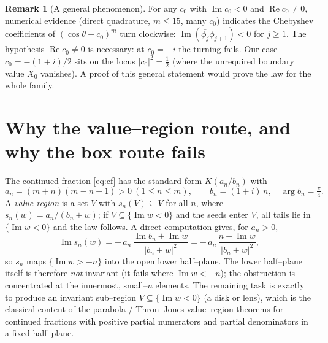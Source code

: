 \documentclass[11pt]{article}
\theoremstyle{definition}
\newtheorem{remark}{Remark}
\renewcommand{\Re}{\operatorname{Re}}
\renewcommand{\Im}{\operatorname{Im}}
\begin{document}
\begin{remark}[A general phenomenon]
For any $c_0$ with $\Im c_0<0$ and $\Re c_0\ne0$, numerical evidence (direct quadrature,
$m\le 15$, many $c_0$) indicates the Chebyshev coefficients of $(\cos\theta-c_0)^m$ turn
clockwise: $\Im(\overline{\phi_j}\phi_{j+1})<0$ for $j\ge1$. The hypothesis $\Re c_0\ne0$ is
necessary: at $c_0=-i$ the turning fails. Our case $c_0=-(1+i)/2$ sits on the locus
$|c_0|^2=\tfrac12$ (where the unrequired boundary value $X_0$ vanishes). A proof of this
general statement would prove the law for the whole family.
\end{remark}

\section{Why the value--region route, and why the box route fails}
The continued fraction \eqref{eq:cf} has the standard form $K(a_n/b_n)$ with
\[
a_n=(m+n)(m-n+1)>0\ (1\le n\le m),\qquad b_n=(1+i)\,n,\quad \arg b_n=\tfrac\pi4 .
\]
A \emph{value region} is a set $V$ with $s_n(V)\subseteq V$ for all $n$, where
$s_n(w)=a_n/(b_n+w)$; if $V\subseteq\{\Im w<0\}$ and the seeds enter $V$, all tails lie in
$\{\Im w<0\}$ and the law follows. A direct computation gives, for $a_n>0$,
\[
\Im s_n(w)=-\,a_n\,\frac{\Im b_n+\Im w}{|b_n+w|^2}=-\,a_n\,\frac{n+\Im w}{|b_n+w|^2},
\]
so $s_n$ maps $\{\Im w>-n\}$ into the open lower half--plane. The lower half--plane itself is
therefore \emph{not} invariant (it fails where $\Im w<-n$); the obstruction is concentrated at
the innermost, small--$n$ elements. The remaining task is exactly to produce an invariant
sub--region $V\subseteq\{\Im w<0\}$ (a disk or lens), which is the classical content of the
parabola / Thron--Jones value--region theorems for continued fractions with positive partial
numerators and partial denominators in a fixed half--plane.
\end{document}
